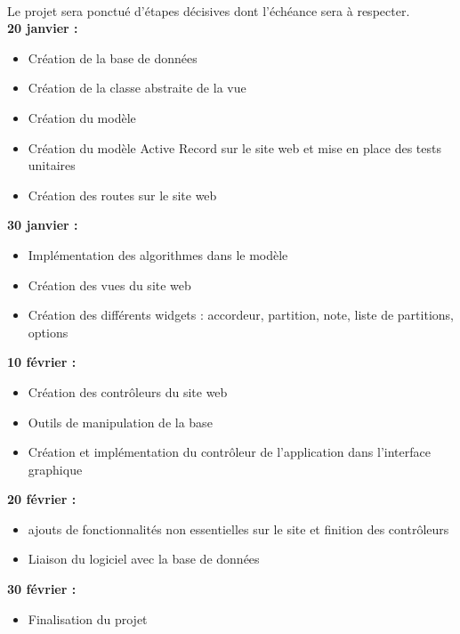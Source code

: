 \paragraph{}
        Le projet sera ponctué d'étapes décisives dont l'échéance sera à respecter. \\
                \textbf{20 janvier :}
                \begin{itemize}
                        \item Création de la base de données 
                        \item Création de la classe abstraite de la vue 
                  \item Création du modèle 
			\item Création du modèle Active Record sur le site web et mise en place des tests unitaires
			\item Création des routes sur le site web
                \end{itemize}
                
                \textbf{30 janvier :}
                \begin{itemize}
                        \item Implémentation des algorithmes dans le modèle
                        \item Création des vues du site web
                        \item Création des différents widgets : accordeur, partition, note, liste de partitions, options
                \end{itemize}
                
                \textbf{10 février :}
                \begin{itemize}
						\item Création des contrôleurs du site web
                        \item Outils de manipulation de la base
                        \item Création et implémentation du contrôleur de l'application dans l'interface graphique
                \end{itemize}
                
                \textbf{20 février :}
                \begin{itemize}
						\item ajouts de fonctionnalités non essentielles sur le site et finition des contrôleurs
                        \item Liaison du logiciel avec la base de données
                \end{itemize}
                
                \textbf{30 février :}
                \begin{itemize}
                        \item Finalisation du projet
                \end{itemize}
